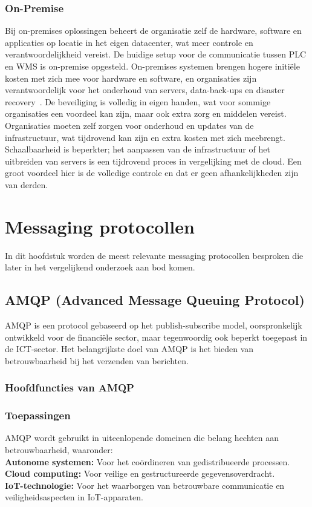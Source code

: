 \subsubsection{On-Premise}
Bij on-premises oplossingen beheert de organisatie zelf de hardware, software en applicaties op locatie in het eigen datacenter, wat meer controle en verantwoordelijkheid vereist.
De huidige setup voor de communicatie tussen PLC en WMS is on-premise opgesteld.
On-premises systemen brengen hogere initiële kosten met zich mee voor hardware en software, 
en organisaties zijn verantwoordelijk voor het onderhoud van servers, data-back-ups en disaster recovery~\autocite{Golec2021}.
De beveiliging is volledig in eigen handen, wat voor sommige organisaties een voordeel kan zijn, maar ook extra zorg en middelen vereist.
Organisaties moeten zelf zorgen voor onderhoud en updates van de infrastructuur, wat tijdrovend kan zijn en extra kosten met zich meebrengt.
Schaalbaarheid is beperkter; het aanpassen van de infrastructuur of het uitbreiden van servers is een tijdrovend proces in vergelijking met de cloud.
Een groot voordeel hier is de volledige controle en dat er geen afhankelijkheden zijn van derden.

\section{Messaging protocollen}
In dit hoofdstuk worden de meest relevante messaging protocollen besproken die later in het vergelijkend onderzoek aan bod komen.

\subsection{AMQP (Advanced Message Queuing Protocol)} 
AMQP is een protocol gebaseerd op het publish-subscribe model, oorspronkelijk ontwikkeld voor de financiële sector, maar tegenwoordig ook beperkt toegepast in de ICT-sector. 
Het belangrijkste doel van AMQP is het bieden van betrouwbaarheid bij het verzenden van berichten.  

\subsubsection{Hoofdfuncties van AMQP}

 
\subsubsection{Toepassingen}
AMQP wordt gebruikt in uiteenlopende domeinen die belang hechten aan betrouwbaarheid, waaronder:
\\
\textbf{Autonome systemen:} Voor het coördineren van gedistribueerde processen. \\ 
\textbf{Cloud computing:} Voor veilige en gestructureerde gegevensoverdracht.  \\
\textbf{IoT-technologie:} Voor het waarborgen van betrouwbare communicatie en veiligheidsaspecten in IoT-apparaten.

